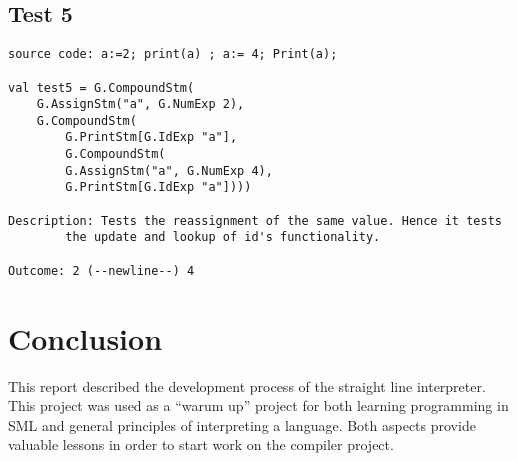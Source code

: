 \documentclass[a4paper]{article}
\begin{document}
\subsection{Test 5}
\begin{lstlisting}
source code: a:=2; print(a) ; a:= 4; Print(a);

val test5 = G.CompoundStm(
	G.AssignStm("a", G.NumExp 2),
	G.CompoundStm(
	    G.PrintStm[G.IdExp "a"],
	    G.CompoundStm(
		G.AssignStm("a", G.NumExp 4),
		G.PrintStm[G.IdExp "a"])))

Description: Tests the reassignment of the same value. Hence it tests
		the update and lookup of id's functionality.

Outcome: 2 (--newline--) 4
\end{lstlisting}



\section{Conclusion}
This report described the development process of the straight line interpreter. This project was used as a ``warum up'' project for both learning programming in SML and general principles of interpreting a language. Both aspects provide valuable lessons in order to start work on the compiler project. 
\end{document}
